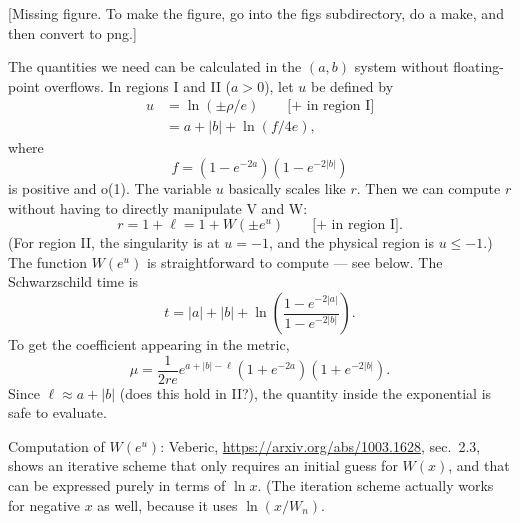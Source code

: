 \documentclass{article}
\begin{document}
%
{%
  [Missing figure. To make the figure, go into the figs subdirectory, do a make, and then convert to png.]
}

The quantities we need can be calculated in the $(a,b)$ system without floating-point overflows.
In regions I and II ($a>0$), let $u$ be defined by
\begin{align*}
  u &= \ln(\pm \rho/e) \qquad \text{[+ in region I]} \\
    &= a+|b|+\ln(f/4e),
\end{align*}
where
\begin{equation*}
  f = (1-e^{-2a})(1-e^{-2|b|})
\end{equation*}
is positive and o(1). The variable $u$ basically scales like $r$.
Then we can compute $r$ without having to directly manipulate V and W:
\begin{equation*}
  r = 1+\ell=1+W(\pm e^u) \qquad \text{[+ in region I]}.
\end{equation*}
(For region II, the singularity is at $u=-1$, and the physical region is $u\le -1$.)
The function $W(e^u)$ is straightforward to compute --- see below.
The Schwarzschild time is
\begin{equation*}
  t = |a|+|b|+\ln\left(\frac{1-e^{-2|a|}}{1-e^{-2|b|}}\right).
\end{equation*}
To get the coefficient appearing in the metric,
\begin{equation*}
  \mu = \frac{1}{2re} e^{a+|b|-\ell}(1+e^{-2a})(1+e^{-2|b|}).
\end{equation*}
Since $\ell\approx a+|b|$ (does this hold in II?), the quantity inside the exponential is safe to evaluate.

Computation of $W(e^u)$:
Veberic, \url{https://arxiv.org/abs/1003.1628}, sec.~2.3, shows an iterative
scheme that only requires an initial guess for $W(x)$, and that can be expressed purely
in terms of $\ln x$. (The iteration scheme actually works for negative $x$ as well, because
it uses $\ln(x/W_n)$.
\end{document}
